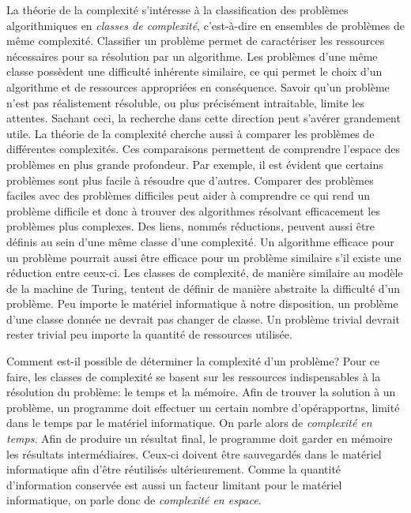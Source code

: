 La théorie de la complexité s'intéresse à la classification des problèmes algorithmiques en \textit{classes de complexité}, c'est-à-dire en ensembles de problèmes de même complexité. Classifier un problème permet de caractériser les ressources nécessaires pour sa résolution par un algorithme. Les problèmes d'une même classe possèdent une difficulté inhérente similaire, ce qui permet le choix d'un algorithme et de ressources appropriées en conséquence. Savoir qu'un problème n'est pas réalistement résoluble, ou plus précisément intraitable, limite les attentes. Sachant ceci, la recherche dans cette direction peut s'avérer grandement utile. La théorie de la complexité cherche aussi à comparer les problèmes de différentes complexités. Ces comparaisons permettent de comprendre l'espace des problèmes en plus grande profondeur. Par exemple, il est évident que certains problèmes sont plus facile à résoudre que d'autres. Comparer des problèmes faciles avec des problèmes difficiles peut aider à comprendre ce qui rend un problème difficile et donc à trouver des algorithmes résolvant efficacement les problèmes plus complexes. Des liens, nommés réductions, peuvent aussi être définis au sein d'une même classe d'une complexité. Un algorithme efficace pour un problème pourrait aussi être efficace pour un problème similaire s'il existe une réduction entre ceux-ci. Les classes de complexité, de manière similaire au modèle de la machine de Turing, tentent de définir de manière abstraite la difficulté d'un problème. Peu importe le matériel informatique à notre disposition, un problème d'une classe donnée ne devrait pas changer de classe. Un problème trivial devrait rester trivial peu importe la quantité de ressources utilisée.  

Comment est-il possible de déterminer la complexité d'un problème? Pour ce faire, les classes de complexité se basent sur les ressources indispensables à la résolution du problème: le temps et la mémoire. Afin de trouver la solution à un problème, un programme doit effectuer un certain nombre d'opérapportns, limité dans le temps par le matériel informatique. On parle alors de \textit{complexité en temps}. Afin de produire un résultat final, le programme doit garder en mémoire les résultats intermédiaires. Ceux-ci doivent être sauvegardés dans le matériel informatique afin d'être réutilisés ultérieurement. Comme la quantité d'information conservée est aussi un facteur limitant pour le matériel informatique, on parle donc de \textit{complexité en espace}. 

